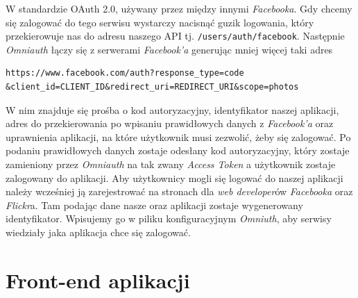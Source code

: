 \documentclass[brudnopis]{xmgr}
\begin{document}
\newpage\indent W standardzie OAuth 2.0, używany przez między innymi \textit{Facebooka}. Gdy chcemy się zalogować do tego serwisu wystarczy nacisnąć guzik logowania, który przekierowuje nas do adresu naszego API tj. \verb|/users/auth/facebook|. Następnie \textit{Omniauth} łączy się z serwerami \textit{Facebook'a} generując mniej więcej taki adres 
\begin{verbatim}
https://www.facebook.com/auth?response_type=code
&client_id=CLIENT_ID&redirect_uri=REDIRECT_URI&scope=photos
\end{verbatim}
 W nim znajduje się prośba o kod autoryzacyjny, identyfikator naszej aplikacji, adres do przekierowania po wpisaniu prawidłowych danych z \textit{Facebook'a} oraz uprawnienia aplikacji, na które użytkownik musi zezwolić, żeby się zalogować. Po podaniu prawidłowych danych zostaje odesłany kod autoryzacyjny, który zostaje zamieniony przez \textit{Omniauth }na tak zwany \textit{Access Token} a użytkownik zostaje zalogowany do aplikacji. Aby użytkownicy mogli się logować do naszej aplikacji należy wcześniej ją zarejestrować na stronach dla \textit{web developer}ów \textit{Facebooka} oraz \textit{Flickr}a. Tam podając dane nasze oraz aplikacji zostaje wygenerowany identyfikator. Wpisujemy go w piliku konfiguracyjnym \textit{Omniuth}, aby serwisy wiedziały jaka aplikacja chce się zalogować.

\section{Front-end aplikacji}
\end{document}
